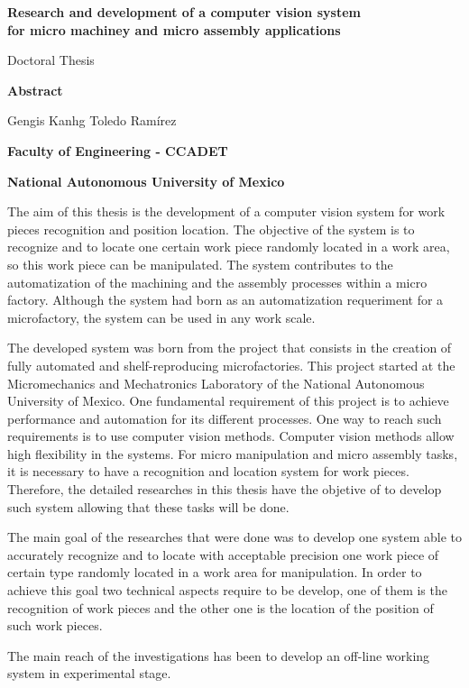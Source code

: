 
\begin{center}
\large{\bf Research and development of a computer vision system\\for micro machiney and micro assembly applications}

\normalsize{Doctoral Thesis}

\large{\textbf{Abstract}}

\normalsize{Gengis Kanhg Toledo Ramírez}

{\bf Faculty of Engineering - CCADET}

{\bf National Autonomous University of Mexico}
\end{center}

The aim of this thesis is the development of a computer vision system for work pieces recognition and position location. The objective of the system is to recognize and to locate one certain work piece randomly located in a work area, so this work piece can be manipulated. The system contributes to the automatization of the machining and the assembly processes within a micro factory. Although the system had born as an automatization requeriment for a microfactory, the system can be used in any work scale.

The developed system was born from the project that consists in the creation of fully automated and shelf-reproducing microfactories. This project started at the Micromechanics and Mechatronics Laboratory of the National Autonomous University of Mexico. One fundamental requirement of this project is to achieve performance and automation for its different processes. One way to reach such requirements is to use computer vision methods. Computer vision methods allow high flexibility in the systems. For micro manipulation and micro assembly tasks, it is necessary to have a recognition and location system for work pieces. Therefore, the detailed researches in this thesis have the objetive of to develop such system allowing that these tasks will be done. 

The main goal of the researches that were done was to develop one system able to accurately recognize and to locate with acceptable precision one work piece of certain type randomly located in a work area for manipulation. In order to achieve this goal two technical aspects require to be develop, one of them is the recognition of work pieces and the other one is the location of the position of such work pieces. 

The main reach of the investigations has been to develop an off-line working system in experimental stage.

